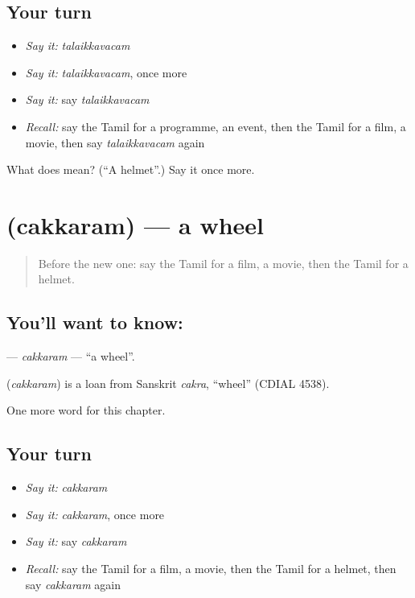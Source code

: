 \subsection*{Your turn}
\begin{itemize}
\raggedright
  \item \emph{Say it:} \emph{talaikkavacam}
  \item \emph{Say it:} \emph{talaikkavacam}, once more
  \item \emph{Say it:} say \emph{talaikkavacam}
  \item \emph{Recall:} say the Tamil for a programme, an event, then the Tamil for a film, a movie, then say \emph{talaikkavacam} again
\end{itemize}

\begin{tcolorbox}[breakable,colback=teal!4,colframe=teal!35!black,title={Before you move on}]
What does  mean? (\textquotedblleft{}A helmet\textquotedblright{}.) Say it once more.
\end{tcolorbox}
\section[\texorpdfstring{\ta{சக்கரம்} (cakkaram)}{சக்கரம் (cakkaram)}]{ (cakkaram) — a wheel}

\label{lesson:TA-C221-cakkaram}



\begin{quote}
Before the new one: say the Tamil for a film, a movie, then the Tamil for a helmet.
\end{quote}

\subsection*{You'll want to know: }
\textbf{} — \emph{cakkaram} — \textquotedblleft{}a wheel\textquotedblright{}.

\begin{cousinweb}
\textbf{} (\emph{cakkaram}) is a loan from Sanskrit \emph{cakra}, \textquotedblleft{}wheel\textquotedblright{} (CDIAL 4538).
\end{cousinweb}

\begin{grammarlens}[title={What you've built}]
One more word for this chapter.
\end{grammarlens}

\subsection*{Your turn}
\begin{itemize}
\raggedright
  \item \emph{Say it:} \emph{cakkaram}
  \item \emph{Say it:} \emph{cakkaram}, once more
  \item \emph{Say it:} say \emph{cakkaram}
  \item \emph{Recall:} say the Tamil for a film, a movie, then the Tamil for a helmet, then say \emph{cakkaram} again
\end{itemize}

